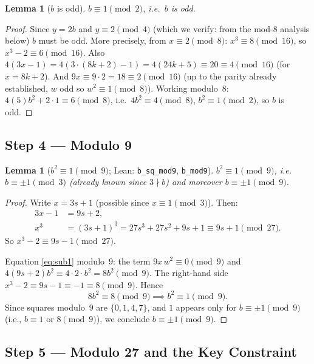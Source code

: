 \documentclass[12pt,a4paper]{article}
\newtheorem{lemma}[theorem]{Lemma}
\begin{document}
\begin{lemma}[$b$ is odd]\label{lem:bodd}
$b \equiv 1 \pmod 2$, i.e.\ $b$ is odd.
\end{lemma}

\begin{proof}
Since $y = 2b$ and $y \equiv 2 \pmod 4$ (which we verify: from the mod-8
analysis below) $b$ must be odd. More precisely, from $x \equiv 2 \pmod 8$:
$x^3 \equiv 8 \pmod{16}$, so $x^3-2 \equiv 6 \pmod{16}$. Also $4(3x-1) =
4(3\cdot(8k+2)-1) = 4(24k+5) \equiv 20 \equiv 4 \pmod{16}$ (for $x=8k+2$).
And $9x \equiv 9\cdot2 = 18 \equiv 2 \pmod{16}$ (up to the parity already established, $w$ odd so $w^2 \equiv 1 \pmod 8$). Working modulo~$8$:
$4(5)b^2 + 2\cdot1 \equiv 6 \pmod 8$, i.e.\ $4b^2\equiv 4\pmod 8$,
$b^2\equiv 1\pmod 2$, so $b$ is odd.
\end{proof}

\subsection{Step 4 --- Modulo 9}

\begin{lemma}[$b^2 \equiv 1 \pmod 9$; Lean: \texttt{b\_sq\_mod9}, \texttt{b\_mod9}]\label{lem:bmod9}
$b^2 \equiv 1 \pmod 9$, i.e.\ $b \equiv \pm 1 \pmod 3$ (already known since
$3\nmid b$) and moreover $b \equiv \pm 1 \pmod 9$.
\end{lemma}

\begin{proof}
Write $x = 3s+1$ (possible since $x \equiv 1 \pmod 3$). Then:
\begin{align*}
  3x-1 &= 9s+2,\\
  x^3   &= (3s+1)^3 = 27s^3+27s^2+9s+1 \equiv 9s+1 \pmod{27}.
\end{align*}
So $x^3 - 2 \equiv 9s - 1 \pmod{27}$.

Equation \eqref{eq:sub1} modulo~$9$: the term $9x\,w^2 \equiv 0 \pmod 9$ and
$4(9s+2)b^2 \equiv 4\cdot2\cdot b^2 = 8b^2 \pmod 9$. The right-hand side
$x^3-2 \equiv 9s-1 \equiv -1 \equiv 8 \pmod 9$. Hence
\[
  8b^2 \equiv 8 \pmod 9 \implies b^2 \equiv 1 \pmod 9.
\]
Since squares modulo~$9$ are $\{0,1,4,7\}$, and $1$ appears only for $b
\equiv \pm1 \pmod 9$ (i.e., $b \equiv 1$ or $8 \pmod 9$), we conclude
$b \equiv \pm 1 \pmod 9$.
\end{proof}

\subsection{Step 5 --- Modulo 27 and the Key Constraint}
\end{document}
